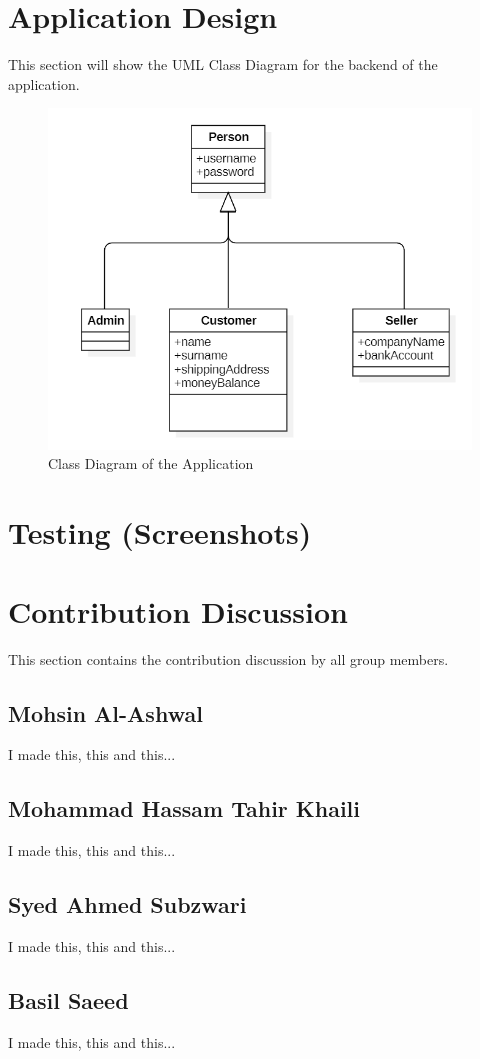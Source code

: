\documentclass[12pt, a4paper]{article}   %
\begin{document}
\break

\section{Application Design}           %

This section will show the UML Class Diagram for the backend of the application.

\begin{figure}[h]
\begin{center}
\includegraphics[width=120mm]{umlSample.PNG}
\caption{Class Diagram of the Application}
\end{center}
\end{figure}

\section{Testing (Screenshots)}

\section{Contribution Discussion}
This section contains the contribution discussion by all group members.
\subsection{\small{Mohsin Al-Ashwal}}
I made this, this and this...
\subsection{\small{Mohammad Hassam Tahir Khaili}}
I made this, this and this...
\subsection{\small{Syed Ahmed Subzwari}}
I made this, this and this...
\subsection{\small{Basil Saeed}}
I made this, this and this...
\end{document}
